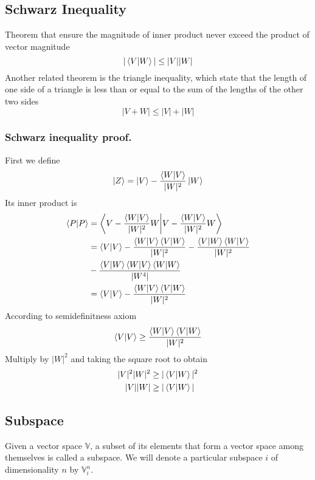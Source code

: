 \documentclass[../main.tex]{subfiles}
\begin{document}
\subsection*{Schwarz Inequality}
Theorem that ensure the magnitude of inner product never exceed the product of vector magnitude
\begin{equation*}
	|\braket{V|W}|\leq|V||W|
\end{equation*}
Another related theorem is the triangle inequality, which state that the length of one side of a triangle is less than or equal to the sum of the lengths of the other two sides
\begin{equation*}
	|V+W|\leq|V|+|W|
\end{equation*}

\subsubsection*{Schwarz inequality proof.}
First we define
\begin{equation*}
	\ket{Z}=\ket{V}-\frac{\braket{W|V }}{|W|^2}\ket{W}
\end{equation*}
Its inner product is
\begin{align*}
	\braket{P|P} & =\bigg\langle V-\frac{\braket{W|V }}{|W|^2} W\bigg|V-\frac{\braket{W|V }}{|W|^2}W\bigg\rangle    \\
	             & =\braket{V|V} -\frac{\braket{W|V }\braket{V|W }}{|W|^2}-\frac{\braket{V|W }\braket{W|V }}{|W|^2} \\
	             & -\frac{\braket{V|W }\braket{W|V }\braket{W|W}}{|W^4|}                                            \\
	             & =\braket{V|V}-\frac{\braket{W|V }\braket{V|W }}{|W|^2}
\end{align*}
According to semidefinitness axiom
\begin{equation*}
	\braket{V|V}\geq \frac{\braket{W|V }\braket{ V|W}}{|W|^2}
\end{equation*}
Multiply by $|W|^2$ and taking the square root to obtain
\begin{align*}
	|V|^2|W|^2 & \geq|\braket{V|W}|^2 \\
	|V||W|     & \geq|\braket{V|W}|
\end{align*}

\subsection*{Subspace}
Given a vector space $\mathbb{V}$, a subset of its elements that form a vector space among themselves is called a subspace.
We will denote a particular subspace $i$ of dimensionality $n$ by $\mathbb{V}_i^n$.
\end{document}
